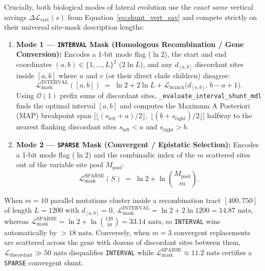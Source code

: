 \documentclass[11pt,a4paper]{article}
\begin{document}
Crucially, both biological modes of lateral evolution use the \emph{exact same} vertical savings $\Delta\mathcal{L}_{\text{vert}}(s)$ from Equation~\eqref{eq:shunt_vert_sav} and compete strictly on their universal site-mask description lengths:
\begin{enumerate}[leftmargin=1.8em]
    \item \textbf{Mode 1 --- \texttt{INTERVAL} Mask (Homologous Recombination / Gene Conversion):}
    Encodes a 1-bit mode flag ($\ln 2$), the start and end coordinates $(a, b) \in \{1,\dots,L\}^2$ ($2\ln L$), and any $d_{[a,b]}$ discordant sites inside $[a,b]$ where $u$ and $v$ (or their direct clade children) disagree:
    \begin{equation}
        \mathcal{L}_{\text{mask}}^{\text{INTERVAL}}([a,b]) \;=\; \ln 2 + 2\ln L + \mathcal{L}_{\text{branch}}\big(d_{[a,b]},\, b - a + 1\big).
        \label{eq:mask_interval}
    \end{equation}
    Using $\mathcal{O}(1)$ prefix sums of discordant sites, \texttt{\_evaluate\_interval\_shunt\_mdl} finds the optimal interval $[a,b]$ and computes the Maximum A Posteriori (MAP) breakpoint span $\big[\lfloor(s_{\text{left}} + a)/2\rfloor,\; \lfloor(b + s_{\text{right}})/2\rfloor\big]$ halfway to the nearest flanking discordant sites $s_{\text{left}} < a$ and $s_{\text{right}} > b$.

    \item \textbf{Mode 2 --- \texttt{SPARSE} Mask (Convergent / Epistatic Selection):}
    Encodes a 1-bit mode flag ($\ln 2$) and the combinadic index of the $m$ scattered sites out of the variable site pool $M_{\text{pool}}$:
    \begin{equation}
        \mathcal{L}_{\text{mask}}^{\text{SPARSE}}(S) \;=\; \ln 2 + \ln\binom{M_{\text{pool}}}{m}.
        \label{eq:mask_sparse}
    \end{equation}
\end{enumerate}
When $m=10$ parallel mutations cluster inside a recombination tract $[400, 750]$ of length $L=1200$ with $d_{[a,b]}=0$, $\mathcal{L}_{\text{mask}}^{\text{INTERVAL}} = \ln 2 + 2\ln 1200 = 14.87\text{ nats}$, whereas $\mathcal{L}_{\text{mask}}^{\text{SPARSE}} = \ln 2 + \ln\binom{120}{10} = 33.14\text{ nats}$, so \texttt{INTERVAL} wins automatically by $>18\text{ nats}$. Conversely, when $m=3$ convergent replacements are scattered across the gene with dozens of discordant sites between them, $\mathcal{L}_{\text{discordant}} \gg 50\text{ nats}$ disqualifies \texttt{INTERVAL} while $\mathcal{L}_{\text{mask}}^{\text{SPARSE}} \approx 11.2\text{ nats}$ certifies a \texttt{SPARSE} convergent shunt.
\end{document}
